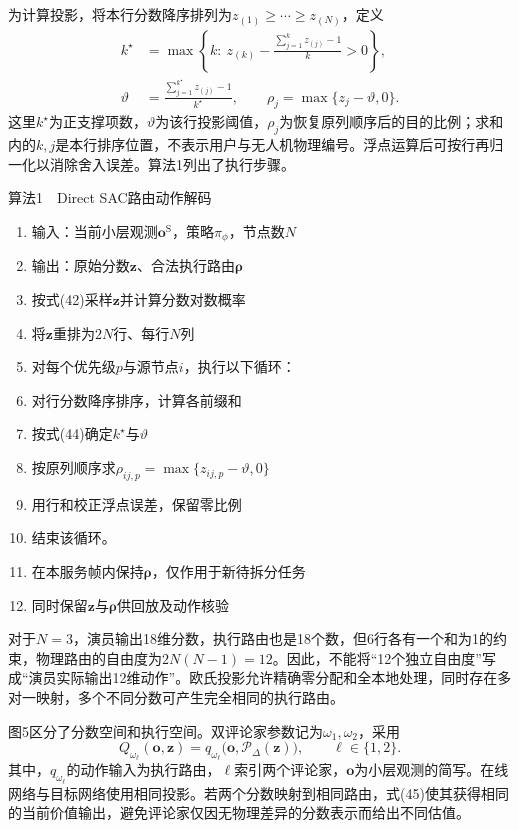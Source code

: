 为计算投影，将本行分数降序排列为$z_{(1)}\ge\cdots\ge z_{(N)}$，定义
\[
\begin{aligned}
 k^\star&=\max\left\{k:\
 z_{(k)}-\frac{\sum_{j=1}^{k}z_{(j)}-1}{k}>0\right\},\\
 \vartheta&=\frac{\sum_{j=1}^{k^\star}z_{(j)}-1}{k^\star},\qquad
 \rho_j=\max\{z_j-\vartheta,0\}.
 \end{aligned}\tag{44}
\]
这里$k^\star$为正支撑项数，$\vartheta$为该行投影阈值，$\rho_j$为恢复原列顺序后的目的比例；求和内的$k,j$是本行排序位置，不表示用户与无人机物理编号。浮点运算后可按行再归一化以消除舍入误差。算法1列出了执行步骤。

\par 算法1　Direct SAC路由动作解码\par
\begin{enumerate}
\item 输入：当前小层观测$\boldsymbol o^{\mathrm S}$，策略$\pi_\phi$，节点数$N$
\item 输出：原始分数$\boldsymbol z$、合法执行路由$\boldsymbol\rho$
\item 按式(42)采样$\boldsymbol z$并计算分数对数概率
\item 将$\boldsymbol z$重排为$2N$行、每行$N$列
\item 对每个优先级$p$与源节点$i$，执行以下循环：
\item 对行分数降序排序，计算各前缀和
\item 按式(44)确定$k^\star$与$\vartheta$
\item 按原列顺序求$\rho_{ij,p}=\max\{z_{ij,p}-\vartheta,0\}$
\item 用行和校正浮点误差，保留零比例
\item 结束该循环。
\item 在本服务帧内保持$\boldsymbol\rho$，仅作用于新待拆分任务
\item 同时保留$\boldsymbol z$与$\boldsymbol\rho$供回放及动作核验
\end{enumerate}

对于$N=3$，演员输出18维分数，执行路由也是18个数，但6行各有一个和为1的约束，物理路由的自由度为$2N(N-1)=12$。因此，不能将“12个独立自由度”写成“演员实际输出12维动作”。欧氏投影允许精确零分配和全本地处理，同时存在多对一映射，多个不同分数可产生完全相同的执行路由。

图5区分了分数空间和执行空间。双评论家参数记为$\omega_1,\omega_2$，采用
\[
Q_{\omega_\ell}(\boldsymbol o,\boldsymbol z)
 =q_{\omega_\ell}\big(\boldsymbol o,\mathcal P_\Delta(\boldsymbol z)\big),
 \qquad \ell\in\{1,2\}.\tag{45}
\]
其中，$q_{\omega_\ell}$的动作输入为执行路由，$\ell$索引两个评论家，$\boldsymbol o$为小层观测的简写。在线网络与目标网络使用相同投影。若两个分数映射到相同路由，式(45)使其获得相同的当前价值输出，避免评论家仅因无物理差异的分数表示而给出不同估值。


